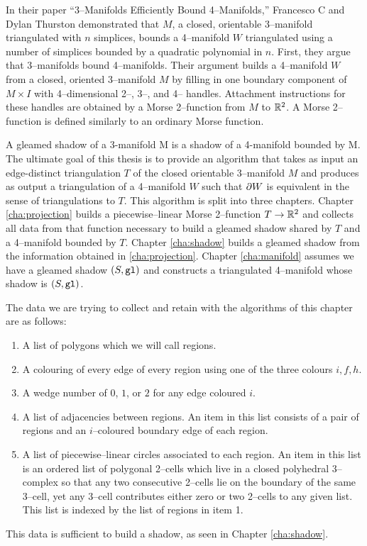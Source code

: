 
In their paper ``3--Manifolds Efficiently Bound 4--Manifolds,'' Francesco C and Dylan Thurston demonstrated that $M$, a closed, orientable 3--manifold triangulated with $n$ simplices, bounds a 4--manifold $W$ triangulated using a number of simplices bounded by a quadratic polynomial in $n$.
First, they argue that 3--manifolds bound 4--manifolds.
Their argument builds a 4--manifold $W$ from a closed, oriented 3--manifold $M$ by filling in one boundary component of $M\times I$ with 4--dimensional 2--, 3--, and 4-- handles.
Attachment instructions for these handles are obtained by a Morse 2--function from $M$ to $\mathbb{R}^2$.
A Morse 2--function is defined similarly to an ordinary Morse function.



A gleamed shadow of a 3-manifold M is a shadow of a 4-manifold bounded by M.
The ultimate goal of this thesis is to provide an algorithm that takes as input an edge-distinct triangulation $T$ of the closed orientable 3--manifold $M$ and produces as output a triangulation of a 4--manifold $W$ such that $\partial W$ is equivalent in the sense of triangulations to $T$.
This algorithm is split into three chapters.
Chapter \ref{cha:projection} builds a piecewise--linear Morse 2--function $T\to\mathbb{R}^2$ and collects all data from that function necessary to build a gleamed shadow shared by $T$ and a 4--manifold bounded by $T$.
Chapter \ref{cha:shadow} builds a gleamed shadow from the information obtained in \ref{cha:projection}.
Chapter \ref{cha:manifold} assumes we have a gleamed shadow $(S,\texttt{gl})$ and constructs a triangulated 4--manifold whose shadow is $(S,\texttt{gl})$.

The data we are trying to collect and retain with the algorithms of this chapter are as follows:
\begin{enumerate}
  \item A list of polygons which we will call regions.
  \item A colouring of every edge of every region using one of the three colours $i,f,h$.
  \item A wedge number of $0$, $1$, or $2$ for any edge coloured $i$.
  \item A list of adjacencies between regions.
        An item in this list consists of a pair of regions and an $i$--coloured boundary edge of each region.
  \item A list of piecewise--linear circles associated to each region.
        An item in this list is an ordered list of polygonal 2--cells which live in a closed polyhedral 3--complex so that any two consecutive 2--cells lie on the boundary of the same 3--cell, yet any 3--cell contributes either zero or two 2--cells to any given list.  This list is indexed by the list of regions in item 1.
\end{enumerate}
This data is sufficient to build a shadow, as seen in Chapter \ref{cha:shadow}.
